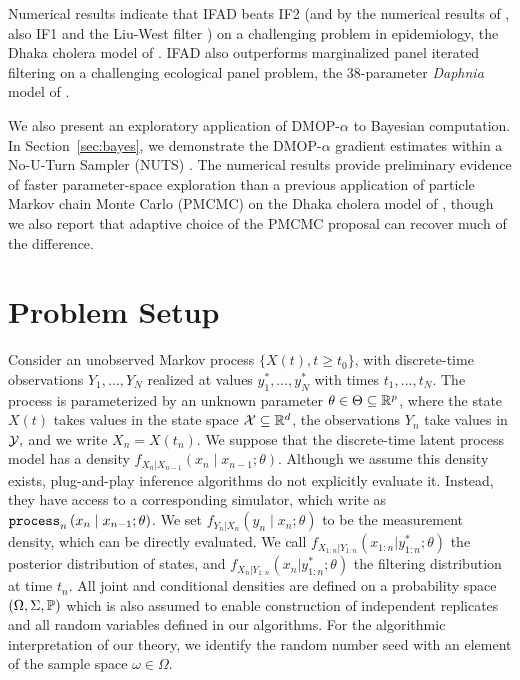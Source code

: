 \documentclass[11pt]{article}
\begin{document}
Numerical results indicate that IFAD beats IF2 (and by the numerical results of \cite{ionides15}, also IF1 and the Liu-West filter \citep{liuwest01}) on a challenging problem in epidemiology, the Dhaka cholera model of \cite{king08}.
IFAD also outperforms marginalized panel iterated filtering on a challenging ecological panel problem, the 38-parameter \textit{Daphnia} model of \citet{yang25daphnia}.
\newEdit{\editPlugAndPlay}

We also present an exploratory application of DMOP-$\alpha$ to Bayesian computation.
In Section~\ref{sec:bayes}, we demonstrate the DMOP-$\alpha$ gradient estimates within a No-U-Turn Sampler (NUTS) \citep{hoffman14}.
The numerical results provide preliminary evidence of faster parameter-space exploration than a previous application of particle Markov chain Monte Carlo (PMCMC) on the Dhaka cholera model of \cite{king08}, though we also report that adaptive choice of the PMCMC proposal can recover much of the difference.

\section{Problem Setup}

Consider an unobserved Markov process $\{X(t),t  \geq t_0\}$, with discrete-time observations $Y_1,...,Y_N$ realized at values $y_1^*,\dots,y_N^*$ with times $t_1,\dots, t_N$.
The process is parameterized by an unknown parameter $\theta \in \Theta \subseteq \mathbb{R}^p$, where the state $X(t)$ takes values in the state space ${\mathcal{X}} \subseteq \mathbb{R}^d$, the observations $Y_n$ take values in ${\mathcal{Y}},$ and we write $X_n = X(t_n)$. We suppose that the discrete-time latent process model has a density $f_{X_n|X_{n-1}}\left(x_{n} \mid x_{n-1}; \theta\right)$.
Although we assume this density exists, plug-and-play inference algorithms do not explicitly evaluate it.
Instead, they have access to a corresponding simulator, which write as $\texttt{process}_n\left(x_n\mid x_{n-1}; \theta\right)$.
We set $f_{Y_n|X_n}\left(y_n \mid x_n; \theta\right)$ to be the measurement density, which can be directly evaluated. 
We call $f_{X_{1:n}|Y_{1:n}}(x_{1:n}|y_{1:n}^*; \theta)$ the posterior distribution of states, and $f_{X_{n}|Y_{1:n}}(x_n|y_{1:n}^*; \theta)$ the filtering distribution at time $t_n$.
All joint and conditional densities are defined on a probability space $(\Omega, \Sigma, \mathbb{P})$ which is also assumed to enable construction of independent replicates and all random variables defined in our algorithms.
For the algorithmic interpretation of our theory, we identify the random number seed with an element of the sample space $\omega \in \Omega$.
\end{document}
